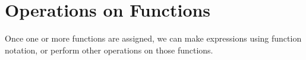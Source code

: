 \begin{maplegroup}
\begin{mapleinput}
\end{mapleinput}
\mapleresult
\begin{maplelatex}
\end{maplelatex}
\end{maplegroup}

\begin{maplegroup}
\begin{mapleinput}
\end{mapleinput}
\mapleresult
\begin{maplelatex}
\end{maplelatex}
\end{maplegroup}

\section{Operations on Functions}
\label{sec:operations_on_functions}

Once one or more functions are assigned, we can make expressions using function notation, or perform other operations on those functions.

